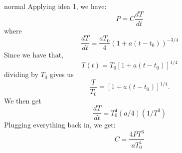 \begin{solution}{normal}
Applying idea 1, we have:
$$P=C\frac{dT}{dt}$$
where
$$\frac{dT}{dt}=\frac{aT_0}{4}(1+a(t-t_0))^{-3/4}$$
Since we have that,
\[T(t) = T_0 [1 + a(t -t_0)]^{1/4}\]
dividing by $T_0$ gives us 
\[\frac{T}{T_0} = [1 + a(t - t_0)]^{1/4}.\]
We then get 
$$\frac{dT}{dt}=T_0^4(a/4)(1/T^3)$$
Plugging everything back in, we get:
$$\boxed{C=\frac{4PT^3}{aT_0^4}}$$
\end{solution}